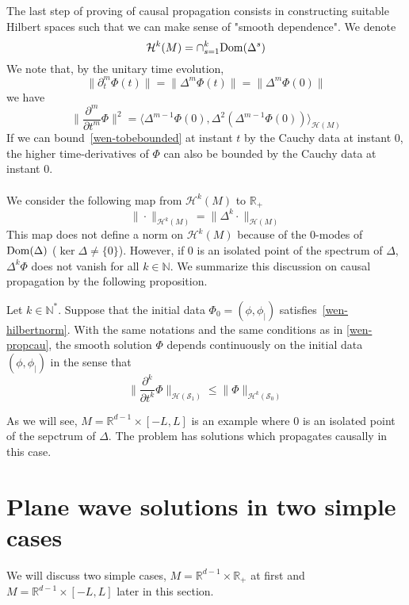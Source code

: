 %
The last step of proving of causal propagation consists in constructing suitable Hilbert spaces such that we can make sense of "smooth dependence". 
We denote 
\begin{equation*}
\mathcal{H}^k(M) = \cap_{s=1}^{k} \mathrm{Dom}(\Delta^s)
\end{equation*}
We note that, by the unitary time evolution, 
\begin{equation*}
\big\|\partial_t^m \Phi(t) \big\|= 
\big\|\Delta^m\Phi(t) \big\| =
\big\|\Delta^m \Phi(0) \big\|
\end{equation*} 
we have
\begin{equation*}
 \Big\|\frac{\partial^{m}}{\partial t^{m}} \Phi \Big\|^2 = 
 \langle \Delta^{m-1}\Phi(0), \Delta^{2}(\Delta^{m-1} \Phi(0))\rangle_{\mathcal{H}(M)} 
\end{equation*}
If we can bound~\cref{wen-tobebounded} at instant $t$ by the Cauchy data at instant $0$, 
the higher time-derivatives of $\Phi$ can also be bounded by the Cauchy data at instant $0$.\\\\
We consider the following map from $\mathcal{H}^k(M)$ to $\mathbb{R}_+$
\begin{equation}\label{wen-hilbertnorm}
\| \cdot \|_{\mathcal{H}^k(M)} = \| \Delta^k \cdot \|_{\mathcal{H}(M)}
\end{equation}
This map does not define a norm on $\mathcal{H}^k(M)$ because of the 0-modes of $\mathrm{Dom}(\Delta)$ ($\ker \Delta \neq \{0\}$).
However, 
if 0 is an isolated point of the spectrum of $\Delta$, $\Delta^k \Phi$ does not vanish for all $k\in\mathbb{N}$.
We summarize this discussion on causal propagation by the following proposition.
\begin{proposition}
Let $k \in \mathbb{N}^*$.
Suppose that the initial data $\Phi_0 = (\phi, \phi_|)$ satisfies~\cref{wen-hilbertnorm}.
With the same notations and the same conditions as in \cref{wen-propcau}, 
the smooth solution $\Phi$ depends continuously on the initial data $(\phi, \phi_|)$ in the sense that
\begin{equation*}
\big\| \frac{\partial^k}{\partial t^k} \Phi\big\|_{\mathcal{H}(\mathcal{S}_1)}
\leq
\big\| \Phi\big\|_{\mathcal{H}^{k}(\mathcal{S}_0)}
\end{equation*}
\end{proposition}
%
\begin{remark}
As we will see, $M = \mathbb{R}^{d-1}\times[-L,L]$ is an example where 0 is an isolated point of the sepctrum of $\Delta$. 
The problem has solutions which propagates causally in this case.
\end{remark}
\section{Plane wave solutions in two simple cases}
We will discuss two simple cases, $M = \mathbb{R}^{d-1} \times \mathbb{R}_+$ at first and $M = \mathbb{R}^{d-1} \times [-L, L]$ later in this section. 






